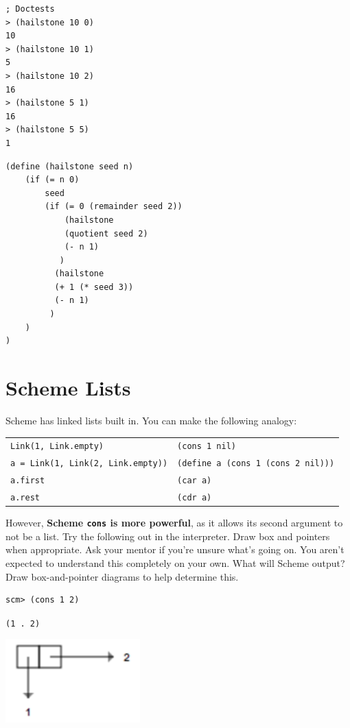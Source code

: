 \documentclass{exam}
\begin{document}
\begin{questions}
\begin{blocksection}
\begin{nonsol}
\begin{lstlisting}
; Doctests
> (hailstone 10 0)
10
> (hailstone 10 1)
5
> (hailstone 10 2)
16
> (hailstone 5 1)
16
> (hailstone 5 5)
1
\end{lstlisting}
\end{nonsol}

\begin{solution}[1in]
\begin{lstlisting}
(define (hailstone seed n)
    (if (= n 0)
        seed
        (if (= 0 (remainder seed 2))
            (hailstone
            (quotient seed 2)
            (- n 1)
           )
          (hailstone
          (+ 1 (* seed 3))
          (- n 1)
         )
    )
)
\end{lstlisting}
\end{solution}
\end{blocksection}

\section{Scheme Lists}
\begin{blocksection}
\begin{nonsol}
Scheme has linked lists built in. You can make the following analogy:
\begin{center}
\begin{tabular}{ |l|l| }
\hline
 \texttt{Link(1, Link.empty)} & \texttt{(cons 1 nil)} \\
 \texttt{a = Link(1, Link(2, Link.empty))} & \texttt{(define a (cons 1 (cons 2 nil)))}  \\
 \texttt{a.first} & \texttt{(car a)} \\
 \texttt{a.rest} & \texttt{(cdr a)} \\
 \hline
\end{tabular}
\end{center}
However, \textbf{Scheme \texttt{cons} is more powerful}, as it allows its second argument to not be a list. Try the following out in the interpreter. Draw box and pointers when appropriate. Ask your mentor if you're unsure what's going on. You aren't expected to understand this completely on your own.
\question What will Scheme output? Draw box-and-pointer diagrams to help determine this.
\end{nonsol}

\begin{lstlisting}
scm> (cons 1 2)
\end{lstlisting}
\begin{solution}[0.25in]
\texttt{(1 . 2)}
\begin{center}
\includegraphics[scale=0.7]{9a}
\end{center}
\end{solution}


\end{blocksection}
\end{questions}
\end{document}
